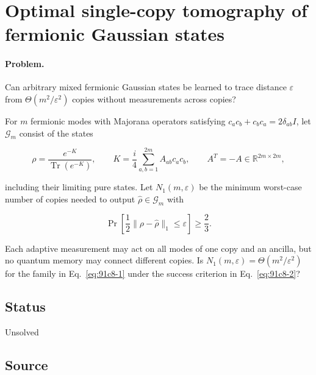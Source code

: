 \section{Optimal single-copy tomography of fermionic Gaussian states}
\label{sec:op_91c81ca77b99eebf}

\paragraph{Problem.}
Can arbitrary mixed fermionic Gaussian states be learned to trace distance $\varepsilon$ from $\Theta(m^2/\varepsilon^2)$ copies without measurements across copies?

For $m$ fermionic modes with Majorana operators satisfying $c_ac_b+c_bc_a=2\delta_{ab}I$, let $\mathcal G_m$ consist of the states

\begin{equation}
\rho=\frac{e^{-K}}{\operatorname{Tr}(e^{-K})},
\qquad
K=\frac{i}{4}\sum_{a,b=1}^{2m}A_{ab}c_ac_b,
\qquad
A^T=-A\in\mathbb R^{2m\times2m},
\label{eq:91c8-1}
\end{equation}

including their limiting pure states. Let $N_1(m,\varepsilon)$ be the minimum worst-case number of copies needed to output $\widehat\rho\in\mathcal G_m$ with

\begin{equation}
\Pr\!\left[\frac12\|\rho-\widehat\rho\|_1\leq\varepsilon\right]\geq\frac23.
\label{eq:91c8-2}
\end{equation}

Each adaptive measurement may act on all modes of one copy and an ancilla, but no quantum memory may connect different copies. Is $N_1(m,\varepsilon)=\Theta(m^2/\varepsilon^2)$ for the family in Eq.~\eqref{eq:91c8-1} under the success criterion in Eq.~\eqref{eq:91c8-2}?

\subsection*{Status}

Unsolved

\subsection*{Source}

